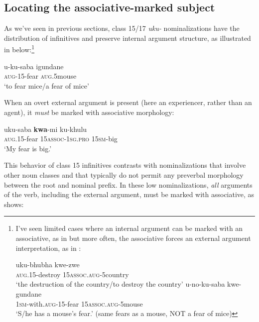 \documentclass[output=paper,colorlinks,citecolor=brown]{langscibook}
\begin{document}
\subsection{Locating the associative-marked subject}\label{sec:halpert:3.1}

As we've seen in previous sections, class 15/17 \textit{uku-} nominalizations have the distribution of infinitives and preserve internal argument structure, as illustrated in  below:\footnote{I've seen limited cases where an internal argument can be marked with an associative, as in  but more often, the associative forces an external argument interpretation, as in :

\ea%
    \label{ex:halpert:fn1}
    \ea%
    \label{ex:halpert:fn1a}
    \gll    uku-bhubha kwe-zwe\\
            \textsc{aug}.15-destroy 15\textsc{assoc}.\textsc{aug}-5country\\
    \glt    `the destruction of the country/to destroy the country'
    \ex%
    \label{ex:halpert:fn1b}
    \gll    u-no-ku-saba kwe-gundane\\
            1\textsc{sm}-with.\textsc{aug}-15-fear 15\textsc{assoc}.\textsc{aug}-5mouse\\
    \glt    `S/he has a mouse's fear.' (same fears as a mouse, NOT a fear of mice)
    \z 
\z 
}

\ea%
    \label{ex:halpert:12} 
    \gll    u-ku-saba igundane\\
            \textsc{aug}-15-fear \textsc{aug}.5mouse\\
    \glt    `to fear mice/a fear of mice'
\z 

When an overt external argument is present (here an experiencer, rather than an agent), it \textit{must} be marked with associative morphology:

\ea%
    \label{ex:halpert:13}
    \gll    uku-saba \textbf{kwa}-mi ku-khulu\\
            \textsc{aug}.15-fear 15\textsc{assoc}-1\textsc{sg}.\textsc{pro} 15\textsc{sm}-big\\
    \glt    `My fear is big.'
\z 

This behavior of class 15 infinitives contrasts with nominalizations that involve other noun classes and that typically do not permit any preverbal morphology between the root and nominal prefix.  In these low nominalizations, \textit{all} arguments of the verb, including the external argument, must be marked with associative, as  shows:
\end{document}
